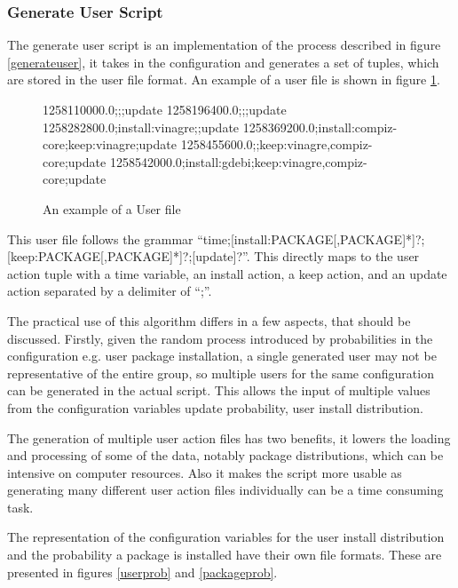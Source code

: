 \subsubsection{Generate User Script}
The generate user script is an implementation of the process described in figure \ref{generateuser}, it takes in the configuration and generates a set of tuples, which are stored in the user file format.
An example of a user file is shown in figure \ref{userfile}.

\begin{figure}[htp]
\begin{center}
1258110000.0;;;update
1258196400.0;;;update
1258282800.0;install:vinagre;;update
1258369200.0;install:compiz-core;keep:vinagre;update
1258455600.0;;keep:vinagre,compiz-core;update
1258542000.0;install:gdebi;keep:vinagre,compiz-core;update
  \caption[User File example]{An example of a User file}
  \label{userfile}
\end{center}
\end{figure}

This user file follows the grammar ``time;[install:PACKAGE[,PACKAGE]*]?;[keep:PACKAGE[,PACKAGE]*]?;[update]?''.
This directly maps to the user action tuple with a time variable, an install action, a keep action, and an update action separated by a delimiter of ``;''.

The practical use of this algorithm differs in a few aspects, that should be discussed.
Firstly, given the random process introduced by probabilities in the configuration e.g. user package installation,
a single generated user may not be representative of the entire group, so multiple users for the same configuration can be generated in the actual script.
This allows the input of multiple values from the configuration variables update probability, user install distribution.

The generation of multiple user action files has two benefits, it lowers the loading and processing of some of the data, notably package distributions, which can be intensive on computer resources.
Also it makes the script more usable as generating many different user action files individually can be a time consuming task.

The representation of the configuration variables for the user install distribution and the probability a package is installed have their own file formats.
These are presented in figures \ref{userprob} and \ref{packageprob}.


